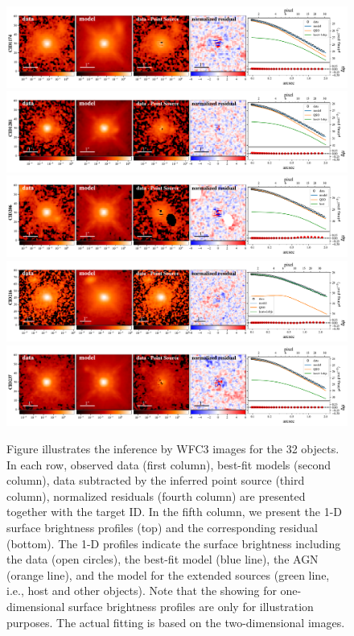 \documentclass[apj]{emulateapj}
\begin{document}
\begin{figure}
\centering
{
\includegraphics[height=0.25\textwidth]{fig/best_fit_CID1174_SB_profile.pdf}
\includegraphics[height=0.25\textwidth]{fig/best_fit_CID1281_SB_profile.pdf}
\includegraphics[height=0.25\textwidth]{fig/best_fit_CID206_SB_profile.pdf}
\includegraphics[height=0.25\textwidth]{fig/best_fit_CID216_SB_profile.pdf}
\includegraphics[height=0.25\textwidth]{fig/best_fit_CID237_SB_profile.pdf}
\caption{\label{fig:AGN_decomp} 
Figure illustrates the inference by WFC3 images for the 32 objects.
In each row, observed data (first column), best-fit models (second column), data subtracted by the inferred point source (third column),  normalized residuals (fourth column) are presented together with the target ID. In the fifth column, we present the 1-D surface brightness profiles (top) and the corresponding residual (bottom). The 1-D profiles indicate the surface brightness including the data (open circles), the best-fit model (blue line), the AGN (orange line), and the model for the extended sources (green line, i.e., host and other objects). Note that the showing for one-dimensional surface brightness profiles are only for illustration purposes. The actual fitting is based on the two-dimensional images.
}}
\end{figure} 
\end{document}
